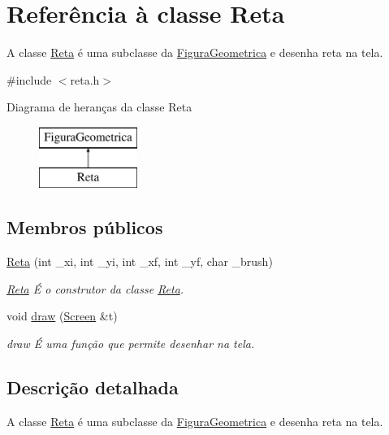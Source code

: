 \hypertarget{class_reta}{}\section{Referência à classe Reta}
\label{class_reta}


A classe \mbox{\hyperlink{class_reta}{Reta}} é uma subclasse da \mbox{\hyperlink{class_figura_geometrica}{Figura\+Geometrica}} e desenha reta na tela.  




{\ttfamily \#include $<$reta.\+h$>$}

Diagrama de heranças da classe Reta\begin{figure}[H]
\begin{center}
\leavevmode
\includegraphics[height=2.000000cm]{class_reta}
\end{center}
\end{figure}
\subsection*{Membros públicos}
\begin{DoxyCompactItemize}
\item 
\mbox{\hyperlink{class_reta_aa399d9c0a34aafd01ce4017f49731148}{Reta}} (int \+\_\+xi, int \+\_\+yi, int \+\_\+xf, int \+\_\+yf, char \+\_\+brush)
\begin{DoxyCompactList}\small\item\em \mbox{\hyperlink{class_reta}{Reta}} É o construtor da classe \mbox{\hyperlink{class_reta}{Reta}}. \end{DoxyCompactList}\item 
void \mbox{\hyperlink{class_reta_ac2e9805183cd474b62bffd8b032cd780}{draw}} (\mbox{\hyperlink{class_screen}{Screen}} \&t)
\begin{DoxyCompactList}\small\item\em draw É uma função que permite desenhar na tela. \end{DoxyCompactList}\end{DoxyCompactItemize}


\subsection{Descrição detalhada}
A classe \mbox{\hyperlink{class_reta}{Reta}} é uma subclasse da \mbox{\hyperlink{class_figura_geometrica}{Figura\+Geometrica}} e desenha reta na tela. 

